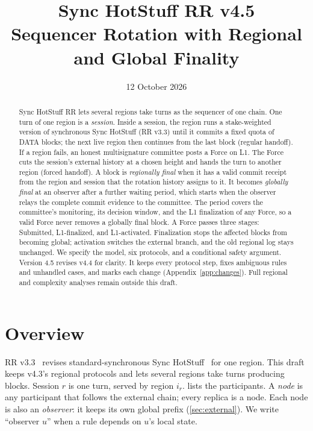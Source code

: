 \documentclass[11pt,a4paper]{article}
\title{Sync HotStuff RR v4.5\\\large Sequencer Rotation with Regional and Global Finality}
\author{}\date{12 October 2026}
\newif\ifrevmarks
\newcommand{\Rv}[1]{\ifrevmarks\leavevmode{\color{rvBlue}#1}\else#1\fi}
\newcommand{\Cid}[1]{\ifrevmarks\textsuperscript{\hyperlink{chg:#1}{\color{rvBlue}\sffamily\scriptsize#1}}\fi}
\newcounter{protocol}
\begin{document}
\maketitle
\begin{abstract}
\Rv{Sync HotStuff RR lets several regions take turns as the
sequencer of one chain. One turn of one region is a \emph{session}.
Inside a session, the region runs a stake-weighted version of synchronous
Sync HotStuff (RR v3.3) until it commits a fixed quota of DATA blocks;
the next live region then continues from the last block (regular
handoff). If a region fails, an honest multisignature committee posts a
Force on L1. The Force cuts the session's external history at a chosen
height and hands the turn to another region (forced handoff). A block is
\emph{regionally final} when it has a valid commit receipt from the
region and session that the rotation history assigns to it. It becomes
\emph{globally final} at an observer after a further waiting period,
which starts when the observer relays the complete commit evidence to
the committee. The period covers the committee's monitoring, its
decision window, and the L1 finalization of any Force, so a valid Force
never removes a globally final block. A Force passes three stages:
Submitted, L1-finalized, and L1-activated. Finalization stops the
affected blocks from becoming global; activation switches the external
branch, and the old regional log stays unchanged. We specify the model, six
protocols, and a conditional safety argument. Version 4.5 revises v4.4
for clarity. It keeps every protocol step, fixes ambiguous rules and
unhandled cases, and marks each change (Appendix~\ref{app:changes}).}
Full regional and complexity analyses remain outside this draft.
\end{abstract}

\ifrevmarks
\begin{center}
\fbox{\parbox{.95\linewidth}{\small\textbf{Reading the v4.5 marks.}
Black text is unchanged from v4.4, except Appendix~\ref{app:changes},
which is new. \Rv{Blue text is new or changed in v4.5.} A blue tag such as \Cid{C2} links to the change log in
Appendix~\ref{app:changes}, which also lists removed text. Red keeps its v4.4
meaning: a difference from RR v3.3 in the regional protocols. Set
\texttt{\textbackslash revmarksfalse} in the preamble for a clean copy.}}
\end{center}
\fi

\section{Overview}
\label{sec:overview}
RR v3.3~\cite{rr33} revises standard-synchronous Sync HotStuff~\cite{sync}
for one region. This draft keeps v4.3's regional protocols and lets several regions
take turns producing blocks. Session $r$ is one turn, served by region $i_r$.
\Rv{ lists the participants. A \emph{node} is any
participant that follows the external chain; every replica is a node.
Each node is also an \emph{observer}: it keeps its own global prefix
(\cref{sec:external}). We write ``observer $u$'' when a rule depends on
$u$'s local state.}
\end{document}
